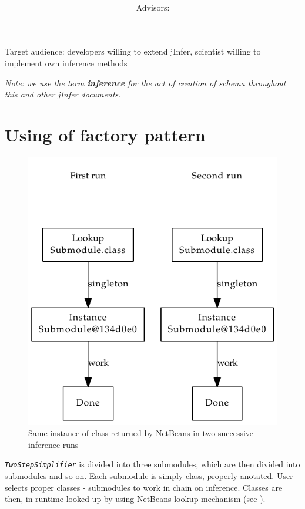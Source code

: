 \documentclass[a4paper,10pt,oneside]{article}
\title{\bf\mftitle}
\author{\mfauthor \\ Advisors: \mfadvisor}
\date{\mfplacedate}
\newcommand{\myscale}{0.74}
\newcommand{\jmodule}[1]{\texttt{\textsl{#1}}}
\begin{document}
\maketitle
\noindent Target audience: developers willing to extend jInfer, scientist willing to implement own inference methods

\noindent \emph{Note: we use the term \textbf{inference} for the act of creation of schema throughout this and other jInfer documents.}

\section{Using of factory pattern}
\begin{figure}
	\centering\includegraphics[scale=\myscale]{factory_pattern1}
	\caption{Same instance of class returned by NetBeans in two successive inference runs} \label{factory_pattern1}
\end{figure}
\jmodule{TwoStepSimplifier} is divided into three submodules, which are then divided into submodules and so on.
Each submodule is simply class, properly anotated.
User selects proper classes - submodules to work in chain on inference.
Classes are then, in runtime looked up by using NetBeans lookup mechanism (see \cite[p. 16]{arch}).
\end{document}

